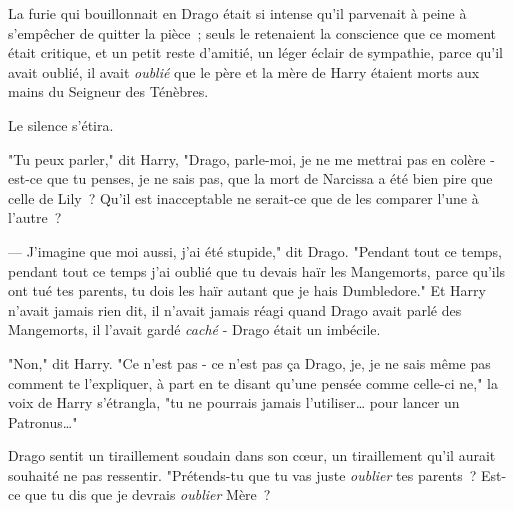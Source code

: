 \later

La furie qui bouillonnait en Drago était si intense qu'il parvenait à peine à s'empêcher de quitter la pièce~; seuls le retenaient la conscience que ce moment était critique, et un petit reste d'amitié, un léger éclair de sympathie, parce qu'il avait oublié, il avait \emph{oublié} que le père et la mère de Harry étaient morts aux mains du Seigneur des Ténèbres.

Le silence s'étira.

"Tu peux parler," dit Harry, "Drago, parle-moi, je ne me mettrai pas en colère - est-ce que tu penses, je ne sais pas, que la mort de Narcissa a été bien pire que celle de Lily~? Qu'il est inacceptable ne serait-ce que de les comparer l'une à l'autre~?

--- J'imagine que moi aussi, j'ai été stupide," dit Drago. "Pendant tout ce temps, pendant tout ce temps j'ai oublié que tu devais haïr les Mangemorts, parce qu'ils ont tué tes parents, tu dois les haïr autant que je hais Dumbledore." Et Harry n'avait jamais rien dit, il n'avait jamais réagi quand Drago avait parlé des Mangemorts, il l'avait gardé \emph{caché} - Drago était un imbécile.

"Non," dit Harry. "Ce n'est pas - ce n'est pas ça Drago, je, je ne sais même pas comment te l'expliquer, à part en te disant qu'une pensée comme celle-ci ne," la voix de Harry s'étrangla, "tu ne pourrais jamais l'utiliser… pour lancer un Patronus…"

Drago sentit un tiraillement soudain dans son cœur, un tiraillement qu'il aurait souhaité ne pas ressentir. "Prétends-tu que tu vas juste \emph{oublier} tes parents~? Est-ce que tu dis que je devrais \emph{oublier} Mère~?


